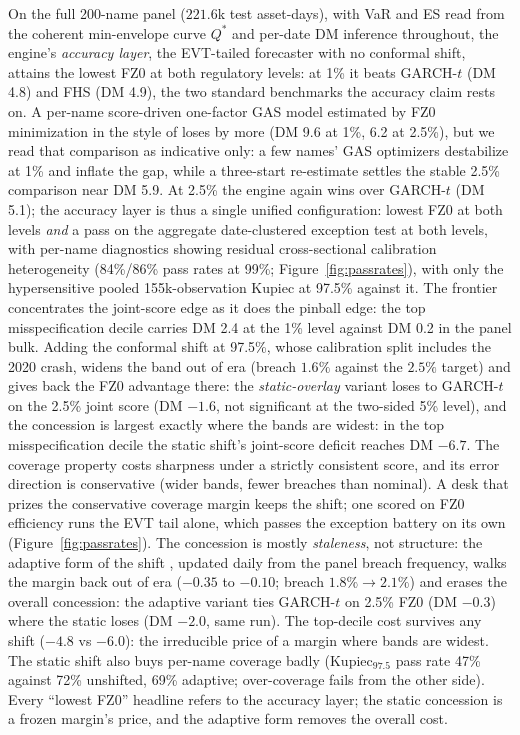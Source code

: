 \documentclass[11pt]{article}
\theoremstyle{remark}
\begin{document}
On the full 200-name
panel ($221.6$k test asset-days), with VaR and ES read from the
coherent min-envelope curve $Q^{*}$ and per-date DM inference
throughout, the engine's \emph{accuracy layer}, the EVT-tailed forecaster with no
conformal shift, attains the
lowest FZ0 at both regulatory levels: at 1\% it beats GARCH-$t$ (DM 4.8) and FHS (DM 4.9), the two standard
benchmarks the accuracy claim rests on. A per-name score-driven
one-factor GAS model estimated by FZ0 minimization in the style of
\citet{patton2019} loses by more (DM 9.6 at 1\%, 6.2 at 2.5\%), but we
read that comparison as indicative only: a few names' GAS optimizers
destabilize at 1\% and inflate the gap, while a three-start re-estimate
settles the stable 2.5\% comparison near DM 5.9. At 2.5\% the engine
again wins over GARCH-$t$ (DM 5.1); the accuracy layer is thus a single
unified configuration: lowest FZ0 at both
levels \emph{and} a pass on the aggregate date-clustered exception
test at both levels, with per-name diagnostics showing residual
cross-sectional calibration heterogeneity (84\%/86\% pass rates at
99\%; Figure~\ref{fig:passrates}),
with only the hypersensitive pooled 155k-observation Kupiec at 97.5\%
against it. The frontier concentrates the joint-score
edge as it does the pinball edge: the top misspecification decile
carries DM 2.4 at the 1\% level against DM 0.2 in the panel bulk.
Adding the conformal shift at 97.5\%, whose calibration split includes
the 2020 crash, widens the band out of era (breach $1.6\%$ against the $2.5\%$ target) and gives
back the FZ0 advantage there: the \emph{static-overlay} variant loses to
GARCH-$t$ on the 2.5\% joint score (DM $-1.6$, not significant at
the two-sided 5\% level), and the concession is largest exactly where
the bands are widest: in the top misspecification decile the
static shift's joint-score deficit reaches DM $-6.7$. The coverage
property costs sharpness under
a strictly consistent score, and its error direction is conservative
(wider bands, fewer breaches than nominal). A desk that prizes the
conservative coverage margin keeps the shift; one scored on FZ0
efficiency
runs the EVT tail alone, which passes the exception battery on its
own (Figure~\ref{fig:passrates}). The concession is
mostly \emph{staleness}, not structure: the adaptive form of the
shift \citep{gibbs2021aci}, updated daily from the panel breach
frequency, walks the margin back out of era ($-0.35$ to $-0.10$;
breach $1.8\%\to2.1\%$) and erases the overall concession: the
adaptive variant ties GARCH-$t$ on 2.5\% FZ0 (DM $-0.3$) where the
static loses (DM $-2.0$, same run). The top-decile cost survives any
shift ($-4.8$ vs $-6.0$): the irreducible price of a margin where
bands are widest. The static shift also buys per-name coverage badly
(Kupiec$_{97.5}$ pass rate 47\% against 72\% unshifted, 69\%
adaptive; over-coverage fails from the other side). Every
``lowest FZ0'' headline refers to the accuracy layer; the static
concession is a frozen margin's price, and the adaptive form removes
the overall cost.
\end{document}
